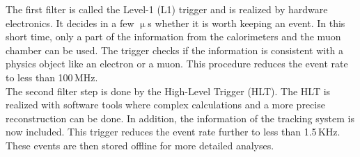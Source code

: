  The first filter is called the Level-1 (L1) trigger and is realized by hardware electronics. It decides in a few $\upmu$s whether it is worth keeping an event. In this short time, only a part of the information from the calorimeters and the muon chamber can be used. The trigger checks if the information is consistent with a physics object like an electron or a muon. This procedure reduces the event rate to less than 100\,MHz. \\

The second filter step is done by the High-Level Trigger (HLT). The HLT is realized with software tools where complex calculations and a more precise reconstruction can be done. In addition, the information of the tracking system is now included. This trigger reduces the event rate further to less than 1.5\,KHz. These events are then stored offline for more detailed analyses. 
